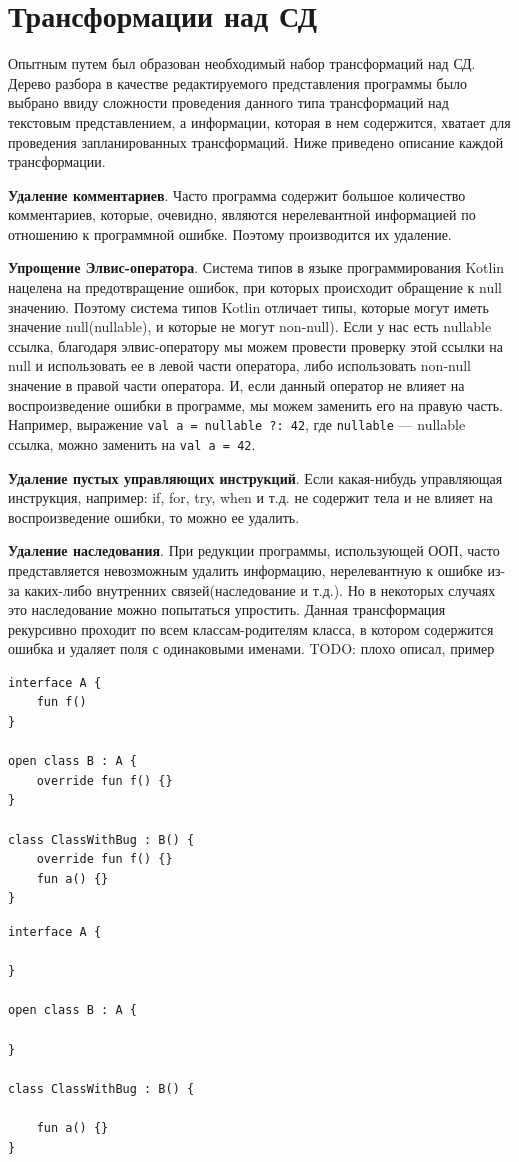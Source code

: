 \section{Трансформации над СД}
Опытным путем был образован необходимый набор трансформаций над СД. Дерево разбора в качестве редактируемого представления программы было выбрано ввиду сложности проведения данного типа трансформаций над текстовым представлением, а информации, которая в нем содержится, хватает для проведения запланированных трансформаций. Ниже приведено описание каждой трансформации. 

\textbf{Удаление комментариев}. Часто программа содержит большое количество комментариев, которые, очевидно, являются нерелевантной информацией по отношению к программной ошибке. Поэтому производится их удаление.

\textbf{Упрощение Элвис-оператора}. Система типов в языке программирования Kotlin нацелена на предотвращение ошибок, при которых происходит обращение к null значению. Поэтому система типов Kotlin отличает типы, которые могут иметь значение null(nullable), и которые не могут non-null). Если у нас есть nullable ссылка, благодаря элвис-оператору мы можем провести проверку этой ссылки на null и использовать ее в левой части оператора, либо использовать non-null значение в правой части оператора. И, если данный оператор не влияет на воспроизведение ошибки в программе, мы можем заменить его на правую часть. Например, выражение \texttt{val a = nullable ?: 42}, где \texttt{nullable} --- nullable ссылка, можно заменить на \texttt{val a = 42}.

\textbf{Удаление пустых управляющих инструкций}. Если какая-нибудь управляющая инструкция, например: if, for, try, when и т.д. не содержит тела и не влияет на воспроизведение ошибки, то можно ее удалить.

\textbf{Удаление наследования}. При редукции программы, использующей ООП, часто представляется невозможным удалить информацию, нерелевантную к ошибке из-за каких-либо внутренних связей(наследование и т.д.). Но в некоторых случаях это наследование можно попытаться упростить. Данная трансформация рекурсивно проходит по всем классам-родителям класса, в котором содержится ошибка и удаляет поля с одинаковыми именами. TODO: плохо описал, пример
\begin{lstlisting}
interface A {
    fun f()
}

open class B : A {
    override fun f() {}
}

class ClassWithBug : B() {
    override fun f() {}
    fun a() {}
}
\end{lstlisting}
\begin{lstlisting}
interface A {

}

open class B : A {

}

class ClassWithBug : B() {

    fun a() {}
}
\end{lstlisting}


